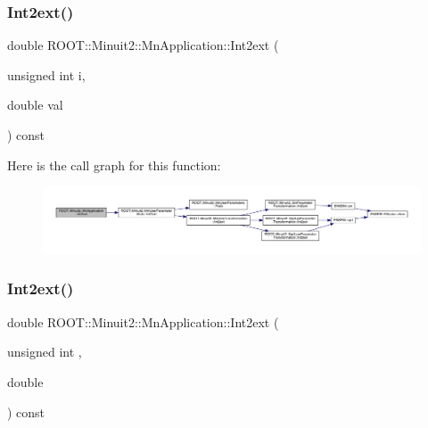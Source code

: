 \subsubsection{\texorpdfstring{Int2ext()}{Int2ext()}\hspace{0.1cm}{\footnotesize\ttfamily [1/3]}}
{\footnotesize\ttfamily double R\+O\+O\+T\+::\+Minuit2\+::\+Mn\+Application\+::\+Int2ext (\begin{DoxyParamCaption}\item[{unsigned int}]{i,  }\item[{double}]{val }\end{DoxyParamCaption}) const}

Here is the call graph for this function\+:
\nopagebreak
\begin{figure}[H]
\begin{center}
\leavevmode
\includegraphics[width=350pt]{df/dd5/classROOT_1_1Minuit2_1_1MnApplication_a1ca8337823e271c40f05f6da6ea8e231_cgraph}
\end{center}
\end{figure}
\mbox{\label{classROOT_1_1Minuit2_1_1MnApplication_a1ca8337823e271c40f05f6da6ea8e231}} 
\subsubsection{\texorpdfstring{Int2ext()}{Int2ext()}\hspace{0.1cm}{\footnotesize\ttfamily [2/3]}}
{\footnotesize\ttfamily double R\+O\+O\+T\+::\+Minuit2\+::\+Mn\+Application\+::\+Int2ext (\begin{DoxyParamCaption}\item[{unsigned int}]{,  }\item[{double}]{ }\end{DoxyParamCaption}) const}

\mbox{\label{classROOT_1_1Minuit2_1_1MnApplication_a1ca8337823e271c40f05f6da6ea8e231}} 
